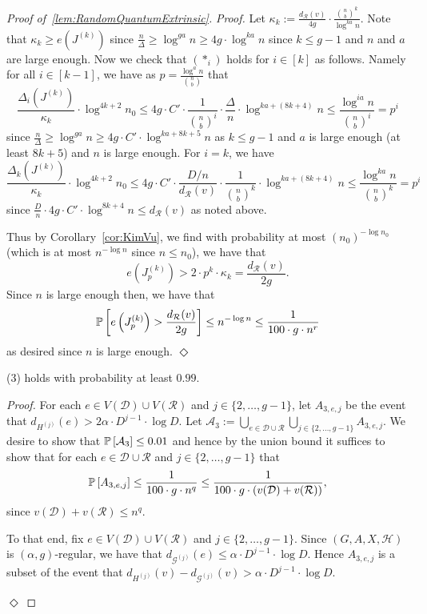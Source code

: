 \documentclass[11pt]{article}
\newcommand{\mc}[1]{\mathcal{#1}}
\newcounter{i}
\theoremstyle{plain}
\newenvironment{proofclaim}[1][]%
{\noindent \emph{Proof.} {}{#1}{}}{\hfill
	$\Diamond$\vspace{1em}}
\renewcommand{\theclaim}{\thetheorem.\arabic{claim}}
\newenvironment{lateproof}[1]
 {%
  \renewcommand{\theclaim}{\ref{#1}.\arabic{claim}}%
  \begin{proof}[Proof of~\cref{#1}]%
 }
 {\end{proof}}
\theoremstyle{plain} %
\theoremstyle{definition}
\newcommand{\Prob}[1]{\ensuremath{%
\mathbb P\left[#1\right]
}}
\begin{document}
\begin{lateproof}{lem:RandomQuantumExtrinsic}
\begin{proofclaim}
Let $\kappa_k:= \frac{d_{\mc{R}}(v)}{4g} \cdot \frac{\binom{n}{b}^k}{\log^{ka} n}$. Note that $\kappa_k\ge e\left(J^{(k)}\right)$ since $\frac{n}{\Delta} \ge \log^{ga} n \ge 4g\cdot \log^{ka} n$ since $k\le g-1$ and $n$ and $a$ are large enough. Now we check that $(*_i)$ holds for $i\in [k]$ as follows. Namely for all $i\in [k-1]$, we have as $p=\frac{\log^a n}{\binom{n}{b}}$ that
$$\frac{\Delta_i\left(J^{(k)}\right)}{\kappa_k}\cdot \log^{4k+2}n_0\le 4g\cdot C'\cdot \frac{1}{\binom{n}{b}^i}\cdot \frac{\Delta}{n} \cdot \log^{ka+(8k+4)}n \le \frac{\log^{ia} n}{\binom{n}{b}^i} = p^i$$ since $\frac{n}{\Delta} \ge \log^{ga}{n} \ge 4g\cdot C'\cdot \log^{ka+8k+5} n$ as  $k\le g-1$ and $a$ is large enough (at least $8k+5$) and $n$ is large enough. 
For $i=k$, we have
$$\frac{\Delta_k\left(J^{(k)}\right)}{\kappa_k}\cdot \log^{4k+2}n_0\le 4g\cdot C'\cdot \frac{D/n}{d_{\mc{R}}(v)}\cdot \frac{1}{\binom{n}{b}^k} \cdot \log^{ka+(8k+4)}n \le \frac{\log^{ka} n}{\binom{n}{b}^k} = p^i$$ since $\frac{D}{n}\cdot 4g\cdot C'\cdot \log^{8k+4} n \le d_{\mc{R}}(v)$ as noted above. 

Thus by Corollary~\ref{cor:KimVu}, we find with probability at most
$(n_0)^{-\log n_0}$ (which is at most $n^{-\log n}$ since $n\le n_0$), we have that
$$e\left(J^{(k)}_p\right) > 2\cdot p^k\cdot \kappa_k = \frac{d_{\mc{R}}(v)}{2g}.$$ 
Since $n$ is large enough then, we have that
$$\Prob{e\left(J^{(k)}_p\right) > \frac{d_{\mc{R}}(v)}{2g}} \le n^{-\log n} \le  \frac{1}{100\cdot g\cdot n^r}$$
as desired since $n$ is large enough.
\end{proofclaim}

\begin{claim}\label{cl:7Holds}
(3) holds with probability at least $0.99$.    
\end{claim}
\begin{proofclaim}
For each $e\in V(\mc{D})\cup V(\mc{R})$ and $j\in \{2,\ldots, g-1\}$, let $A_{3,e,j}$ be the event that $d_{H^{(j)}}(e) > 2\alpha\cdot D^{j-1}\cdot \log D$.
Let $\mathcal{A}_3 := \bigcup_{e\in \mc{D}\cup \mc{R}} \bigcup_{j\in \{2,\ldots,g-1\}} A_{3,e,j}$. We desire to show that $\Prob{\mc{A}_3} \le 0.01$ and hence by the union bound it suffices to show that for each $e\in \mc{D}\cup \mc{R}$ and $j\in \{2,\ldots, g-1\}$ that
$$\Prob{A_{3,e,j}} \le \frac{1}{100\cdot g\cdot n^q} \le \frac{1}{100 \cdot g\cdot (v(\mc{D})+v(\mc{R}))},$$
since $v(\mc{D})+v(\mc{R})\le n^q$.

To that end, fix $e\in V(\mc{D})\cup V(\mc{R})$ and $j\in \{2,\ldots, g-1\}$. Since $(G,A,X,\mc{H})$ is $(\alpha,g)$-regular, we have that  $d_{\mc{G}^{(j)}}(e) \le \alpha\cdot D^{j-1}\cdot \log D$. Hence $A_{3,e,j}$ is a subset of the event that $d_{H^{(j)}}(v) - d_{\mc{G}^{(j)}}(v) > \alpha\cdot D^{j-1}\cdot \log D$. 


\end{proofclaim}
\end{lateproof}
\end{document}
